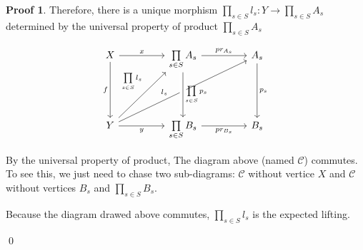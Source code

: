 \documentclass[a4paper]{article}
\theoremstyle{plain}
\theoremstyle{definition}
\newtheorem*{prf}{Proof}
\theoremstyle{remark}
\newcommand{\ms}[1]{\mathscr{#1}}
\newcommand{\msC}{\ms C}
\begin{document}
\begin{prf}
            \par Therefore, there is a unique morphism $\prod\limits_{s \in S} l_s : Y \to \prod\limits_{s \in S} A_s$
            determined by the universal property of product $\prod\limits_{s \in S} A_s$

            \[\begin{tikzcd}[row sep = 1.6cm, column sep = 1.6cm]
                X & {\prod\limits_{s \in S} A_s} & {A_s} \\
                Y & {\prod\limits_{s \in S} B_s} & {B_s}
                \arrow["{pr_{A_s}}", from=1-2, to=1-3]
                \arrow["{pr_{B_s}}"', from=2-2, to=2-3]
                \arrow["{p_s}", from=1-3, to=2-3]
                \arrow["x", from=1-1, to=1-2]
                \arrow["y"', from=2-1, to=2-2]
                \arrow["f"', from=1-1, to=2-1]
                \arrow["{l_s}"{pos = 0.4}, from=2-1, to=1-3]
                \arrow["{\prod\limits_{s\in S} p_s}", from=1-2, to=2-2, crossing over]
                \arrow["{\prod\limits_{s\in S} l_s}"{pos = 0.55}, from=2-1, to=1-2]
            \end{tikzcd}\]

            \par By the universal property of product, The diagram above (named $\msC$) commutes.
            To see this, we just need to chase two sub-diagrams:
            $\msC$ without vertice $X$ and $\msC$ without vertices $B_s$ and ${\prod\limits_{s \in S} B_s}$.
            \par Because the diagram drawed above commutes, ${\prod\limits_{s\in S} l_s}$ is the expected lifting.

        \qed
        
        \end{prf}
\end{document}
